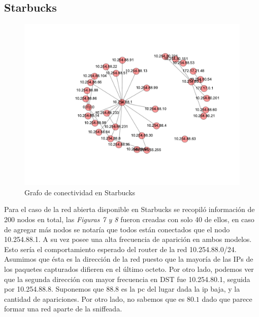 \subsection{Starbucks}

\begin{figure}[h!]
	\begin{center}
		  \includegraphics[scale=.6]{resultados/starbucks/conectividadNX.pdf}
		  \caption{Grafo de conectividad en Starbucks}
		  \label{fig:contra1}
	\end{center}
\end{figure}


Para el caso de la red abierta disponible en Starbucks se recopil\'o
informaci\'on de 200 nodos en total, las \emph{Figuras 7 y 8} fueron 
creadas con solo 40 de ellos, en caso de agregar m\'as nodos se notar\'ia
que todos est\'an conectados que el nodo 10.254.88.1. 
A su vez posee una alta frecuencia de aparici\'on en ambos
modelos. Esto ser\'ia el comportamiento esperado del router de la red
10.254.88.0/24. Asumimos que \'esta es la direcci\'on de la red puesto que 
la mayor\'ia de las IPs de los paquetes capturados difieren en el \'ultimo octeto.
Por otro lado, podemos ver que la segunda direcci\'on con mayor frecuencia en DST
fue 10.254.80.1, seguida por 10.254.88.8. Suponemos que $88.8$ es la pc del lugar
dada la ip baja, y la cantidad de apariciones. Por otro lado, no sabemos que es
$80.1$ dado que parece formar una red aparte de la sniffeada.

